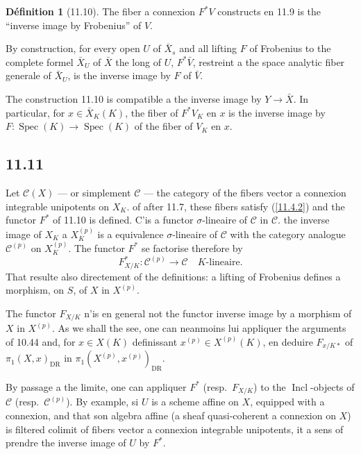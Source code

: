 \documentclass[12pt,a4paper]{article}
\theoremstyle{plain}
\theoremstyle{definition}
\newtheorem{definition}[theorem]{D\'efinition}
\theoremstyle{remark}
\DeclareMathOperator{\Spec}{Spec}
\DeclareMathOperator{\Incl}{Incl}
\newcommand{\DR}{\mathrm{DR}}
\begin{document}
\begin{definition}[11.10]
The fiber a connexion $F^* V$ constructs en 11.9 is the ``inverse image by Frobenius'' of $V$.
\end{definition}

By construction, for every open $U$ of $\bar{X}_s$ and all lifting $F$ of Frobenius to the complete formel $\bar{X}_U$ of $\bar{X}$ the long of $U$, $F^* \bar{V}$, restreint a the space analytic fiber generale of $\bar{X}_U$, is the inverse image by $F$ of $\bar{V}$.

The construction 11.10 is compatible a the inverse image by $Y \to \bar{X}$. In particular, for $x \in \bar{X}_K(K)$, the fiber of $F^* V_K$ en $x$ is the inverse image by $F: \Spec(K) \to \Spec(K)$ of the fiber of $V_K$ en $x$.

\subsection*{11.11}

Let $\mathcal{C}(X)$ --- or simplement $\mathcal{C}$ --- the category of the fibers vector a connexion integrable unipotents on $X_K$. of after 11.7, these fibers satisfy (\ref{11.4.2}) and the functor $F^*$ of 11.10 is defined. C'is a functor $\sigma$-lineaire of $\mathcal{C}$ in $\mathcal{C}$. the inverse image of $X_K$ a $X_K^{(p)}$ is a equivalence $\sigma$-lineaire of $\mathcal{C}$ with the category analogue $\mathcal{C}^{(p)}$ on $X_K^{(p)}$. The functor $F^*$ se factorise therefore by
\begin{equation}\label{11.11.1}
F_{X/K}^*: \mathcal{C}^{(p)} \longrightarrow \mathcal{C} \quad \text{$K$-lineaire.} \tag{11.11.1}
\end{equation}
That resulte also directement of the definitions: a lifting of Frobenius defines a morphism, on $S$, of $X$ in $X^{(p)}$.

The functor $F_{X/K}$ n'is en general not the functor inverse image by a morphism of $X$ in $X^{(p)}$. As we shall the see, one can neanmoins lui appliquer the arguments of 10.44 and, for $x \in X(K)$ definissant $x^{(p)} \in X^{(p)}(K)$, en deduire $F_{x/K *}$ of $\pi_1(X, x)_{\DR}$ in $\pi_1(X^{(p)}, x^{(p)})_{\DR}$.

By passage a the limite, one can appliquer $F^*$ (resp.~$F_{X/K}$) to the $\Incl$-objects of $\mathcal{C}$ (resp.~$\mathcal{C}^{(p)}$). By example, si $U$ is a scheme affine on $X$, equipped with a connexion, and that son algebra affine (a sheaf quasi-coherent a connexion on $X$) is filtered colimit of fibers vector a connexion integrable unipotents, it a sens of prendre the inverse image of $U$ by $F^*$.
\end{document}
